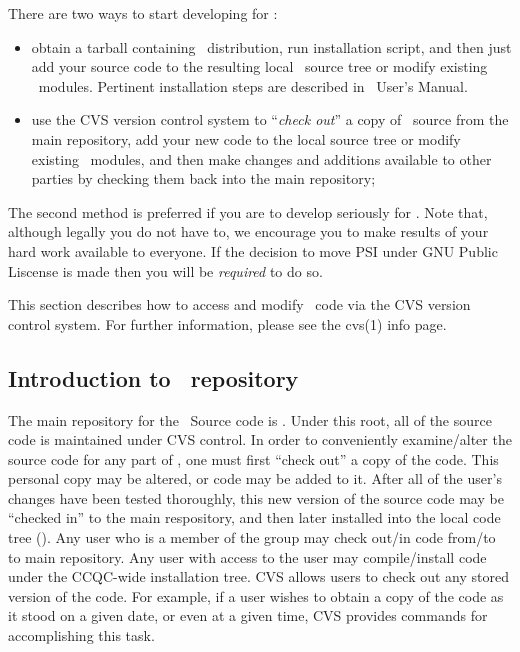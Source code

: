 %
%
%
%
There are two ways to start developing for \PSIthree:
\begin{itemize}
\item obtain a tarball containing \PSIthree\ distribution, run installation script,
and then just add your source code to the resulting local \PSIthree\ source tree
or modify existing \PSIthree\ modules. Pertinent installation steps are described
in \PSIthree\ User's Manual.
\item use the CVS version control system to ``{\em check out}'' a copy of \PSIthree\ 
source from the main repository, add your new code to the local source tree or modify
existing \PSIthree\ modules, and then make changes and additions available to
other parties by checking them back into the main repository;
\end{itemize}
The second method is preferred if you are to develop seriously for \PSIthree.
Note that, although legally you do not have to, we encourage
you to make results of your hard work available to everyone. If the decision
to move PSI under GNU Public Liscense is made then you will be {\em required}
to do so.

This section describes how to access and modify \PSIthree\ code via
the CVS version control system. For further information,
please see the cvs(1) info page.

\subsection{Introduction to \PSIthree\ repository}
The main repository for the \PSIthree\ Source code is
.  Under this root, all of the source code is
maintained under CVS control.  In order to conveniently examine/alter the
source code for any part of \PSIthree, one must first ``check out'' a copy of the
code.  This personal copy may be altered, or code may be added to it.
After all of the user's changes have been tested thoroughly, this new
version of the source code may be ``checked in'' to the main respository,
and then later installed into the local code tree ().
Any user who is a member of the \unixid{psiadm} group may check out/in code
from/to to main repository.  Any user with access to the \unixid{psi} user may
compile/install code under the CCQC-wide installation tree.  CVS allows users to check
out any stored version of the code.  For example, if a user wishes to
obtain a copy of the code as it stood on a given date, or even at a given
time, CVS provides commands for accomplishing this task.

